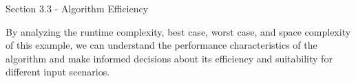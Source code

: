 \begin{notes}{Section 3.3 - Algorithm Efficiency}
\begin{highlight}
        By analyzing the runtime complexity, best case, worst case, and space complexity of this example, we can understand the performance characteristics of the algorithm and make informed decisions about its efficiency and suitability for different input scenarios.
    \end{highlight}
\end{notes}